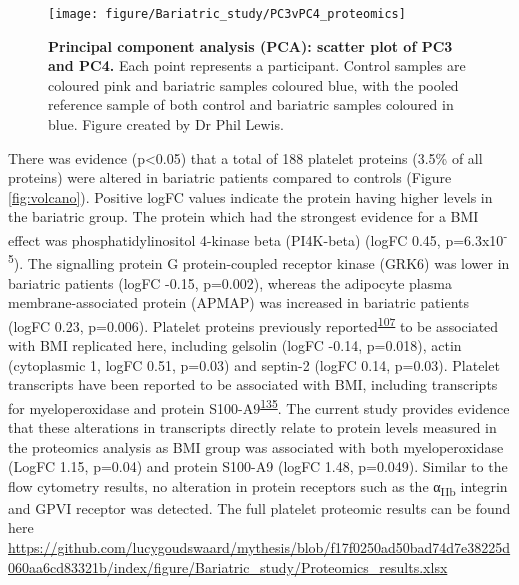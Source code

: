 \documentclass[11pt,twoside]{bristolthesis}
\begin{document}
\begin{figure}

{\centering \texttt{[image: figure/Bariatric\_study/PC3vPC4\_proteomics]} 

}

\caption[Principal component analysis (PCA): scatter plot of PC3 and PC4.]{\textbf{Principal component analysis (PCA): scatter plot of PC3 and PC4.} Each point represents a participant. Control samples are coloured pink and bariatric samples coloured blue, with the pooled reference sample of both control and bariatric samples coloured in blue. Figure created by Dr Phil Lewis.}\label{fig:pca2}
\end{figure}
There was evidence (p\textless0.05) that a total of 188 platelet proteins (3.5\% of all proteins) were altered in bariatric patients compared to controls (Figure \ref{fig:volcano}). Positive logFC values indicate the protein having higher levels in the bariatric group. The protein which had the strongest evidence for a BMI effect was phosphatidylinositol 4-kinase beta (PI4K-beta) (logFC 0.45, p=6.3x10\textsuperscript{-5}). The signalling protein G protein-coupled receptor kinase (GRK6) was lower in bariatric patients (logFC -0.15, p=0.002), whereas the adipocyte plasma membrane-associated protein (APMAP) was increased in bariatric patients (logFC 0.23, p=0.006). Platelet proteins previously reported\textsuperscript{\protect\hyperlink{ref-Barrachina2019}{107}} to be associated with BMI replicated here, including gelsolin (logFC -0.14, p=0.018), actin (cytoplasmic 1, logFC 0.51, p=0.03) and septin-2 (logFC 0.14, p=0.03). Platelet transcripts have been reported to be associated with BMI, including transcripts for myeloperoxidase and protein S100-A9\textsuperscript{\protect\hyperlink{ref-Freedman2010}{135}}. The current study provides evidence that these alterations in transcripts directly relate to protein levels measured in the proteomics analysis as BMI group was associated with both myeloperoxidase (LogFC 1.15, p=0.04) and protein S100-A9 (logFC 1.48, p=0.049). Similar to the flow cytometry results, no alteration in protein receptors such as the α\textsubscript{IIb} integrin and GPVI receptor was detected. The full platelet proteomic results can be found here \url{https://github.com/lucygoudswaard/mythesis/blob/f17f0250ad50bad74d7e38225d060aa6cd83321b/index/figure/Bariatric_study/Proteomics_results.xlsx}
\end{document}

